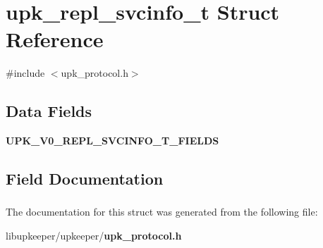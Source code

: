 \section{upk\_\-repl\_\-svcinfo\_\-t Struct Reference}
\label{structupk__repl__svcinfo__t}


{\ttfamily \#include $<$upk\_\-protocol.h$>$}

\subsection*{Data Fields}
\begin{DoxyCompactItemize}
\item 
{\bf UPK\_\-V0\_\-REPL\_\-SVCINFO\_\-T\_\-FIELDS}
\end{DoxyCompactItemize}


\subsection{Field Documentation}
\subsubsection[{UPK\_\-V0\_\-REPL\_\-SVCINFO\_\-T\_\-FIELDS}]{}\label{structupk__repl__svcinfo__t_a8bdbf253811aa5675a03517667e5af46}


The documentation for this struct was generated from the following file:\begin{DoxyCompactItemize}
\item 
libupkeeper/upkeeper/{\bf upk\_\-protocol.h}\end{DoxyCompactItemize}
